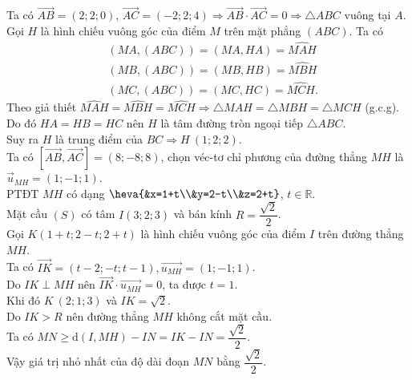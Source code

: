 \begin{ex}
{\begin{center}
\end{center}	
Ta có $\overrightarrow{A B}=(2 ; 2 ; 0)$, $\overrightarrow{A C}=(-2 ; 2 ; 4) \Rightarrow \overrightarrow{A B} \cdot \overrightarrow{A C}=0 \Rightarrow \triangle ABC$ vuông tại $A$.\\
Gọi $H$ là hình chiếu vuông góc của điểm $M$ trên mặt phẳng $(A B C)$. Ta có
$$
\begin{aligned}
	& (MA, (ABC))=(MA, HA)=\widehat{MAH} \\
	& (MB, (ABC))=(MB, HB)=\widehat{MBH} \\
	& (MC, (ABC))=(MC, HC)=\widehat{MCH}.
\end{aligned}
$$
 Theo giả thiết $\widehat{MAH}=\widehat{MBH}=\widehat{MCH} \Rightarrow \triangle MAH=\triangle MBH=\triangle MCH$ (g.c.g).\\
Do đó $HA=HB=HC$ nên $H$ là tâm đường tròn ngoại tiếp $\triangle ABC$.\\
Suy ra $H$ là trung điểm của $BC\Rightarrow H\ (1; 2; 2)$.\\
Ta có $[\overrightarrow{AB}, \overrightarrow{AC}]=(8;-8; 8)$, chọn véc-tơ  chỉ phương của đường thẳng $MH$ là $\overrightarrow{u}_{MH}=(1;-1; 1)$. \\
PTĐT $MH$ có dạng $\heva{&x=1+t\\&y=2-t\\&z=2+t}$, $t\in \mathbb{R}$.\\
	Mặt cầu $(S)$ có tâm $I(3 ; 2 ; 3)$ và bán kính $R=\dfrac{\sqrt{2}}{2}$.\\
 Gọi $K(1+t; 2-t; 2+t)$ là hình chiếu vuông góc của điểm $I$ trên đường thẳng $MH$.\\
Ta có $\overrightarrow{IK}=(t-2;-t; t-1), \overrightarrow{u_{MH}}=(1;-1; 1)$.\\
Do $IK\perp MH$ nên $\overrightarrow{IK} \cdot \overrightarrow{u_{MH}}=0$, ta được $t=1$.\\
Khi đó $K\ (2; 1; 3)$ và $IK=\sqrt{2}$.\\
Do $IK > R$ nên đường thẳng $MH$ không cắt mặt cầu.\\
Ta có $MN\geq \mathrm{d}(I, MH)-IN=IK-IN=\dfrac{\sqrt{2}}{2}$.\\
Vậy giá trị nhỏ nhất của độ dài đoạn $M N$ bằng $\dfrac{\sqrt{2}}{2}$.
	}
\end{ex}